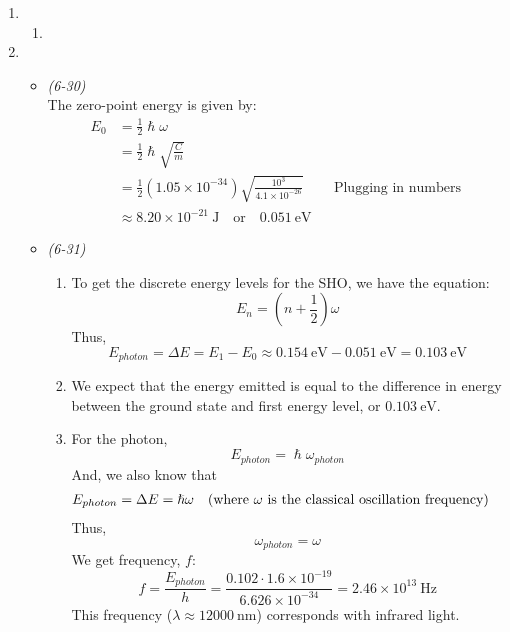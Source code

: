 \documentclass[10pt]{article}
\begin{document}
\begin{enumerate}
\begin{enumerate}
  \end{enumerate}
  \item 
    \begin{enumerate}
      \item 
    \end{enumerate}
  \item 
  \begin{itemize}
    \item
      \textit{(6-30)} \\
      The zero-point energy is given by:
      \begin{align*}
        E_0&=\frac{1}{2} \hslash \omega \\
           &= \frac{1}{2}\hslash \sqrt{\frac{C}{m}} \\
           &= \frac{1}{2} \left( 1.05 \times 10 ^ {-34} \right) \sqrt{\frac{10^3}{4.1 \times 10^{-26}}} && \text{Plugging in numbers} \\
           &\approx 8.20 \times 10 ^{-21}~\text{J} \quad \text{or} \quad 0.051~\text{eV}
      \end{align*}
    \item 
      \textit{(6-31)}
      \begin{enumerate}
      \item To get the discrete energy levels for the SHO, we have the equation:
        \begin{equation*}
          E_n=\left( n+\frac{1}{2} \right)\omega
        \end{equation*}
        Thus,
        \begin{equation*}
          E_{photon} = \Delta E = E_1-E_0 \approx 0.154~\text{eV} - 0.051~\text{eV} = 0.103~\text{eV}
        \end{equation*}
      \item We expect that the energy emitted is equal to the difference in energy between the ground state and first energy level, or $ 0.103~\text{eV} $.
      \item 
        For the photon,
        \begin{equation*}
          E_{photon} = \hslash \omega_{photon}
        \end{equation*}
        And, we also know that
        \begin{align*}
          &E_{photon} = \Delta E = \hslash \omega && \text{(where $ \omega $ is the classical oscillation frequency)}
        \end{align*}
        Thus,
        \begin{equation*}
          \omega_{photon} = \omega
        \end{equation*}
        We get frequency, $ f $:
        \begin{equation*}
          f = \frac{E_{photon}}{h} = \frac{0.102 \cdot 1.6 \times 10^{-19}}{6.626 \times 10^{-34}} = 2.46 \times 10^{13}~\text{Hz}
        \end{equation*}
        This frequency ($ \lambda \approx 12000~\text{nm} $) corresponds with infrared light.
      \end{enumerate}
  \end{itemize}
\end{enumerate}
\end{document}
